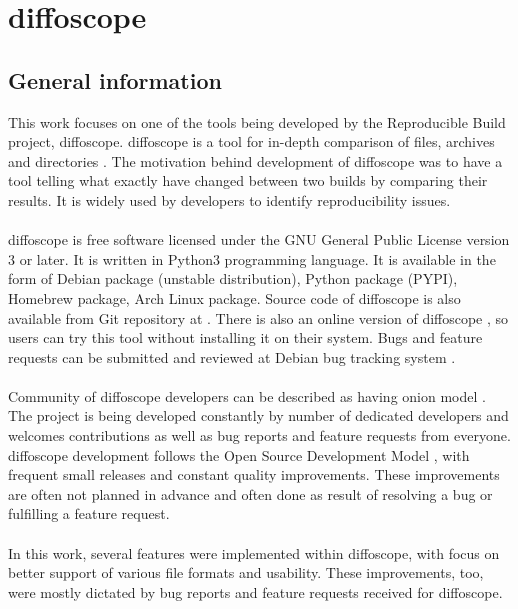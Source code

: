 \chapter{diffoscope}

\section[General information]{General information}
This work focuses on one of the tools being developed by the
Reproducible Build project, diffoscope.
diffoscope is a tool for in-depth comparison of files, archives and
directories \autocite{dfs}.
The motivation behind development of diffoscope was to have a tool
telling what exactly have changed between two builds by comparing
their results. It is widely used by developers to identify reproducibility issues.\\\\
diffoscope is free software licensed under the GNU General Public
License version 3 or later. It is written in Python3 programming language.
It is available in the form of Debian package (unstable distribution),
Python package (PYPI), Homebrew package, Arch Linux package. Source code
of diffoscope is also available from Git repository at \autocite{dfs-git}.
There is also an online version of diffoscope \autocite{try-dfs}, so users
can try this tool without installing it on their system.
Bugs and feature requests can be submitted and reviewed at Debian
bug tracking system \autocite{dfs-bugs}.\\\\
Community of diffoscope developers can be described as having
onion model \autocite{aberdour2007achieving}.
The project is being developed constantly by number of dedicated
developers and welcomes contributions as well as bug reports
and feature requests from everyone.
diffoscope development follows the Open Source Development Model
\autocite{osdm}, with frequent small releases and constant quality improvements.
These improvements are often not planned in advance and often
done as result of resolving a bug or fulfilling a feature request.\\\\
In this work, several features were implemented  within diffoscope,
with focus on better support of various file formats and usability.
These improvements, too, were mostly dictated by bug reports and feature requests
received for diffoscope.

